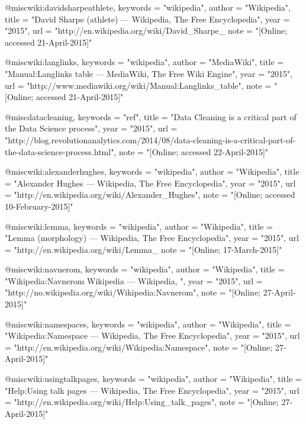 @misc{wiki:davidsharpeathlete,
    keywords    =   "wikipedia",
    author      =   "Wikipedia",
    title       =   "David Sharpe (athlete) --- Wikipedia{,} The Free Encyclopedia",
    year        =   "2015",
    url         =   "http://en.wikipedia.org/wiki/David_Sharpe_%
    note        =   "[Online; accessed 21-April-2015]"
}
 
@misc{wiki:langlinks,
    keywords    =   "wikipedia",
    author      =   "MediaWiki",
    title       =   "Manual:Langlinks table --- MediaWiki{,} The Free Wiki Engine",
    year        =   "2015",
    url         =   "http://www.mediawiki.org/wiki/Manual:Langlinks_table",
    note        =   "[Online; accessed 21-April-2015]"
}

@misc{datacleaning,
    keywords    =   "ref",
    title       =   "Data Cleaning is a critical part of the Data Science process",
    year        =   "2015",
    url         =   "http://blog.revolutionanalytics.com/2014/08/data-cleaning-is-a-critical-part-of-the-data-science-process.html",
    note        =   "[Online; accessed 22-April-2015]"
}
 
 
@misc{wiki:alexanderhughes,
    keywords    =   "wikipedia",
    author      =   "Wikipedia",
    title       =   "Alexander Hughes --- Wikipedia{,} The Free Encyclopedia",
    year        =   "2015",
    url         =   "http://en.wikipedia.org/wiki/Alexander_Hughes",
    note        =   "[Online; accessed 10-February-2015]"
}
 
@misc{wiki:lemma,
    keywords    =   "wikipedia",
    author      =   "Wikipedia",
    title       =   "Lemma (morphology) --- Wikipedia{,} The Free Encyclopedia",
    year        =   "2015",
    url         =   "http://en.wikipedia.org/wiki/Lemma_%
    note        =   "[Online; 17-March-2015]"
}
 
@misc{wiki:navnerom,
    keywords    =   "wikipedia",
    author      =   "Wikipedia",
    title       =   "Wikipedia:Navnerom Wikipedia --- Wikipedia{,} ",
    year        =   "2015",
    url         =   "http://no.wikipedia.org/wiki/Wikipedia:Navnerom",
    note        =   "[Online; 27-April-2015]"
}
 
@misc{wiki:namespaces,
    keywords    =   "wikipedia",
    author      =   "Wikipedia",
    title       =   "Wikipedia:Namespace --- Wikipedia{,} The Free Encyclopedia",
    year        =   "2015",
    url         =   "http://en.wikipedia.org/wiki/Wikipedia:Namespace",
    note        =   "[Online; 27-April-2015]"
} 
 
@misc{wiki:usingtalkpages,
    keywords    =   "wikipedia",
    author      =   "Wikipedia",
    title       =   "Help:Using talk pages --- Wikipedia{,} The Free Encyclopedia",
    year        =   "2015",
    url         =   "http://en.wikipedia.org/wiki/Help:Using_talk_pages",
    note        =   "[Online; 27-April-2015]"
} 
 
